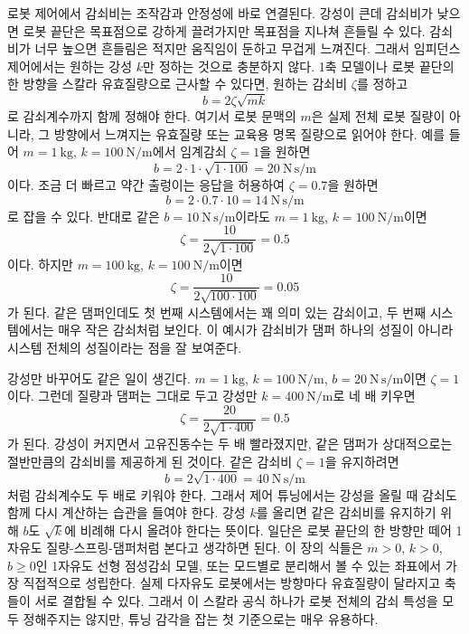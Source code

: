 로봇 제어에서 감쇠비는 조작감과 안정성에 바로 연결된다.
강성이 큰데 감쇠비가 낮으면 로봇 끝단은 목표점으로 강하게 끌려가지만 목표점을 지나쳐 흔들릴 수 있다.
감쇠비가 너무 높으면 흔들림은 적지만 움직임이 둔하고 무겁게 느껴진다.
그래서 임피던스 제어에서는 원하는 강성 $k$만 정하는 것으로 충분하지 않다.
1축 모델이나 로봇 끝단의 한 방향을 스칼라 유효질량으로 근사할 수 있다면, 원하는 감쇠비 $\zeta$를 정하고
\begin{equation}
  b=2\zeta\sqrt{mk}
\end{equation}
로 감쇠계수까지 함께 정해야 한다.
여기서 로봇 문맥의 $m$은 실제 전체 로봇 질량이 아니라, 그 방향에서 느껴지는 유효질량 또는 교육용 명목 질량으로 읽어야 한다.
예를 들어 $m=1~\mathrm{kg}$, $k=100~\mathrm{N/m}$에서 임계감쇠 $\zeta=1$을 원하면
\begin{equation}
  b=2\cdot 1\cdot \sqrt{1\cdot 100}=20~\mathrm{N\,s/m}
\end{equation}
이다.
조금 더 빠르고 약간 출렁이는 응답을 허용하여 $\zeta=0.7$을 원하면
\begin{equation}
  b=2\cdot 0.7\cdot 10=14~\mathrm{N\,s/m}
\end{equation}
로 잡을 수 있다.
반대로 같은 $b=10~\mathrm{N\,s/m}$이라도 $m=1~\mathrm{kg}$, $k=100~\mathrm{N/m}$이면
\begin{equation}
  \zeta=\frac{10}{2\sqrt{1\cdot100}}=0.5
\end{equation}
이다.
하지만 $m=100~\mathrm{kg}$, $k=100~\mathrm{N/m}$이면
\begin{equation}
  \zeta=\frac{10}{2\sqrt{100\cdot100}}=0.05
\end{equation}
가 된다.
같은 댐퍼인데도 첫 번째 시스템에서는 꽤 의미 있는 감쇠이고, 두 번째 시스템에서는 매우 작은 감쇠처럼 보인다.
이 예시가 감쇠비가 댐퍼 하나의 성질이 아니라 시스템 전체의 성질이라는 점을 잘 보여준다.

강성만 바꾸어도 같은 일이 생긴다.
$m=1~\mathrm{kg}$, $k=100~\mathrm{N/m}$, $b=20~\mathrm{N\,s/m}$이면 $\zeta=1$이다.
그런데 질량과 댐퍼는 그대로 두고 강성만 $k=400~\mathrm{N/m}$로 네 배 키우면
\begin{equation}
  \zeta=\frac{20}{2\sqrt{1\cdot400}}=0.5
\end{equation}
가 된다.
강성이 커지면서 고유진동수는 두 배 빨라졌지만, 같은 댐퍼가 상대적으로는 절반만큼의 감쇠비를 제공하게 된 것이다.
같은 감쇠비 $\zeta=1$을 유지하려면
\begin{equation}
  b=2\sqrt{1\cdot400}=40~\mathrm{N\,s/m}
\end{equation}
처럼 감쇠계수도 두 배로 키워야 한다.
그래서 제어 튜닝에서는 강성을 올릴 때 감쇠도 함께 다시 계산하는 습관을 들여야 한다.
강성 $k$를 올리면 같은 감쇠비를 유지하기 위해 $b$도 $\sqrt{k}$에 비례해 다시 올려야 한다는 뜻이다.
일단은 로봇 끝단의 한 방향만 떼어 1자유도 질량-스프링-댐퍼처럼 본다고 생각하면 된다.
이 장의 식들은 $m>0$, $k>0$, $b\ge0$인 1자유도 선형 점성감쇠 모델, 또는 모드별로 분리해서 볼 수 있는 좌표에서 가장 직접적으로 성립한다.
실제 다자유도 로봇에서는 방향마다 유효질량이 달라지고 축들이 서로 결합될 수 있다.
그래서 이 스칼라 공식 하나가 로봇 전체의 감쇠 특성을 모두 정해주지는 않지만, 튜닝 감각을 잡는 첫 기준으로는 매우 유용하다.

